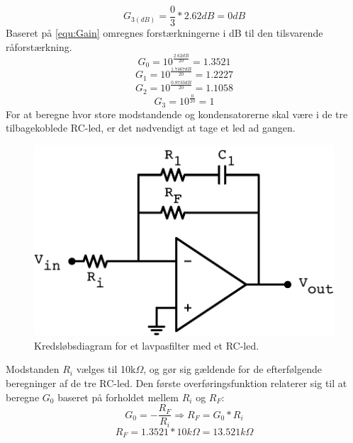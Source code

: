 %
\begin{equation}
	G_{3(dB)} = \frac{0}{3}*2.62dB = 0dB
\end{equation}
%
Baseret på \autoref{equ:Gain} omregnes forstærkningerne i dB til den tilsvarende råforstærkning.
%
\begin{equation}
	G_0 = 10^\frac{2.62dB}{20} = 1.3521
\end{equation}
%
\begin{equation}
	G_1 = 10^\frac{1.7467dB}{20} = 1.2227
\end{equation}
%
\begin{equation}
	G_2 = 10^\frac{0.8733dB}{20} = 1.1058
\end{equation}
%
\begin{equation}
	G_3 = 10^\frac{0}{20} = 1
\end{equation}
%
For at beregne hvor store modstandende og kondensatorerne skal være i de tre tilbagekoblede RC-led, er det nødvendigt at tage et led ad gangen. 
%
\begin{figure}[H]
	\centering
	\includegraphics[resolution=300,scale=\circuitSize]{Figure/DesignAfFilter/FilterWith1.pdf}
	\caption{Kredsløbsdiagram for et lavpasfilter med et RC-led.}
	\label{fig:ELdiagramForFilter}
\end{figure}
\noindent
%
Modstanden $R_i$ vælges til 10k$\Omega$, og gør sig gældende for de efterfølgende beregninger af de tre RC-led. Den første overføringsfunktion relaterer sig til at beregne $G_0$ baseret på forholdet mellem $R_i$ og $R_F$:
%
\begin{equation}
	G_0 = -\frac{R_F}{R_i} \Rightarrow R_F = G_0*R_i
	\label{equ:Tilbagekoblingsmodstand}
\end{equation}
%
\begin{equation}
	R_F =  1.3521*10k\Omega = 13.521k\Omega
\end{equation}
